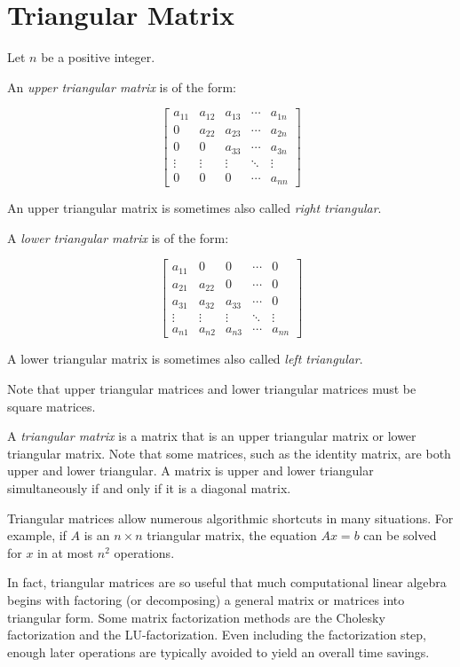 \documentclass[12pt]{article}
\begin{document}

\section{Triangular Matrix}

Let $n$ be a positive integer.

An \emph{upper triangular matrix} is of the form:

$$ \begin{bmatrix}
a_{11} & a_{12} & a_{13} & \cdots & a_{1n} \\
   0   & a_{22} & a_{23} & \cdots & a_{2n} \\
   0   &   0    & a_{33} & \cdots & a_{3n} \\
\vdots & \vdots & \vdots & \ddots & \vdots \\
   0   &   0    &    0   & \cdots & a_{nn}
\end{bmatrix} $$

An upper triangular matrix is sometimes also called \emph{right triangular}.

A \emph{lower triangular matrix} is of the form:

$$ \begin{bmatrix}
a_{11} &   0    &   0    & \cdots &    0   \\
a_{21} & a_{22} &   0    & \cdots &    0   \\
a_{31} & a_{32} & a_{33} & \cdots &    0   \\
\vdots & \vdots & \vdots & \ddots & \vdots \\
a_{n1} & a_{n2} & a_{n3} & \cdots & a_{nn} 
\end{bmatrix} $$

A lower triangular matrix is sometimes also called \emph{left triangular}.

Note that upper triangular matrices and lower triangular matrices must be square matrices.

A \emph{triangular matrix} is a matrix that is an upper triangular matrix or lower triangular matrix.  Note that some matrices, such as the identity matrix, are both upper and lower triangular.  A matrix is upper and lower triangular simultaneously if and only if it is a diagonal matrix.

Triangular matrices allow numerous algorithmic shortcuts in many situations. For example, if $A$ is an $n\times n$ triangular matrix, the equation $Ax=b$ can be solved for $x$ in at most $n^2$ operations.

In fact, triangular matrices are so useful that much computational linear algebra begins with factoring (or decomposing) a general matrix or matrices into triangular form.  Some matrix factorization methods are the Cholesky factorization and the LU-factorization. Even including the factorization step, enough later operations are typically avoided to yield an overall time savings.
\end{document}
